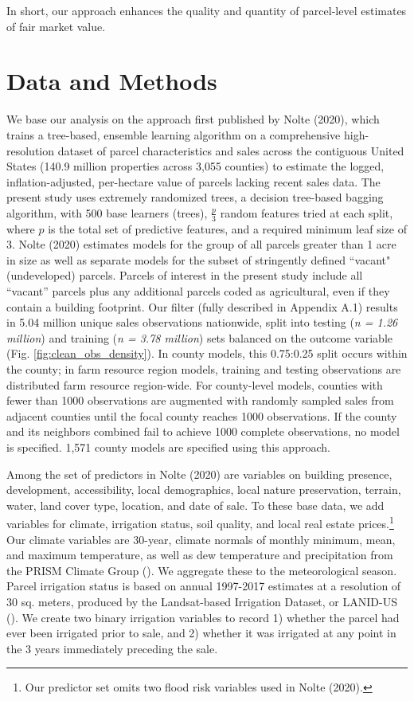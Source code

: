 \documentclass[12pt]{article}
\begin{document}
In short, our approach enhances the quality and quantity of parcel-level estimates of fair market value. 


\section{Data and Methods}
We base our analysis on the approach first published by Nolte (2020), which trains a tree-based, ensemble learning algorithm on a comprehensive high-resolution dataset of parcel characteristics and sales across the contiguous United States (140.9 million properties across 3,055 counties) to estimate the logged, inflation-adjusted, per-hectare value of parcels lacking recent sales data. The present study uses extremely randomized trees, a decision tree-based bagging algorithm, with 500 base learners (trees), $\frac{p}{3}$ random features tried at each split, where $p$ is the total set of predictive features, and a required minimum leaf size of 3. Nolte (2020) estimates models for the group of all parcels greater than 1 acre in size as well as separate models for the subset of stringently defined ``vacant" (undeveloped) parcels. Parcels of interest in the present study include all ``vacant'' parcels plus any additional parcels coded as agricultural, even if they contain a building footprint. Our filter (fully described in Appendix A.1) results in 5.04 million unique sales observations nationwide, split into testing (\textit{n = 1.26 million}) and training (\textit{n = 3.78 million}) sets balanced on the outcome variable (Fig. \ref{fig:clean_obs_density}). In county models, this 0.75:0.25 split occurs within the county; in farm resource region models, training and testing observations are distributed farm resource region-wide. For county-level models, counties with fewer than 1000 observations are augmented with randomly sampled sales from adjacent counties until the focal county reaches 1000 observations. If the county and its neighbors combined fail to achieve 1000 complete observations, no model is specified. 1,571 county models are specified using this approach.

Among the set of predictors in Nolte (2020) are variables on building presence, development, accessibility, local demographics, local nature preservation, terrain, water, land cover type, location, and date of sale. To these base data, we add variables for climate, irrigation status, soil quality, and local real estate prices.\footnote{Our predictor set omits two flood risk variables used in Nolte (2020).} Our climate variables are 30-year, climate normals of monthly minimum, mean, and maximum temperature, as well as dew temperature and precipitation from the PRISM Climate Group (\cite{PRISMClimate2021}). We aggregate these to the meteorological season. Parcel irrigation status is based on annual 1997-2017 estimates at a resolution of 30 sq. meters, produced by the Landsat-based Irrigation Dataset, or LANID-US (\cite{Xie2021MappingStates}). We create two binary irrigation variables to record 1) whether the parcel had ever been irrigated prior to sale, and 2) whether it was irrigated at any point in the 3 years immediately preceding the sale. 
\end{document}
